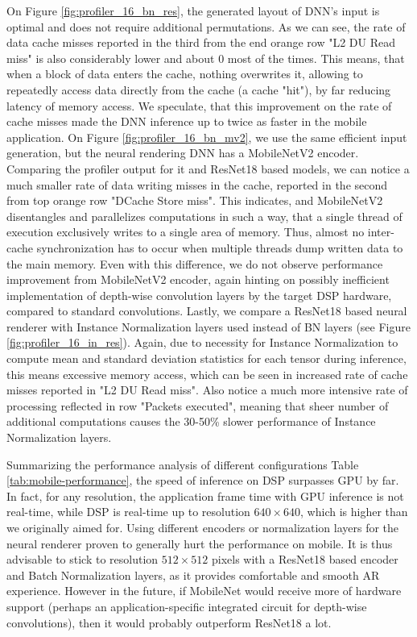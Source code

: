 On Figure \ref{fig:profiler_16_bn_res}, the generated layout of DNN's input is optimal and does not require additional permutations. As we can see, the rate of data cache misses reported in the third from the end orange row "L2 DU Read miss" is also considerably lower and about 0 most of the times. This means, that when a block of data enters the cache, nothing overwrites it, allowing to repeatedly access data directly from the cache (a cache "hit"), by far reducing latency of memory access. We speculate, that this improvement on the rate of cache misses made the DNN inference up to twice as faster in the mobile application. On Figure \ref{fig:profiler_16_bn_mv2}, we use the same efficient input generation, but the neural rendering DNN has a MobileNetV2 encoder. Comparing the profiler output for it and ResNet18 based models, we can notice a much smaller rate of data writing misses in the cache, reported in the second from top orange row "DCache Store miss". This indicates, and MobileNetV2 disentangles and parallelizes computations in such a way, that a single thread of execution exclusively writes to a single area of memory. Thus, almost no inter-cache synchronization has to occur when multiple threads dump written data to the main memory. Even with this difference, we do not observe performance improvement from MobileNetV2 encoder, again hinting on possibly inefficient implementation of depth-wise convolution layers by the target DSP hardware, compared to standard convolutions. Lastly, we compare a ResNet18 based neural renderer with Instance Normalization layers used instead of BN layers (see Figure \ref{fig:profiler_16_in_res}). Again, due to necessity for Instance Normalization to compute mean and standard deviation statistics for each tensor during inference, this means excessive memory access, which can be seen in increased rate of cache misses reported in "L2 DU Read miss". Also notice a much more intensive rate of processing reflected in row "Packets executed", meaning that sheer number of additional computations causes the 30-50\% slower performance of Instance Normalization layers.

Summarizing the performance analysis of different configurations Table \ref{tab:mobile-performance}, the speed of inference on DSP surpasses GPU by far. In fact, for any resolution, the application frame time with GPU inference is not real-time, while DSP is real-time up to resolution $640 \times 640$, which is higher than we originally aimed for. Using different encoders or normalization layers for the neural renderer proven to generally hurt the performance on mobile. It is thus advisable to stick to resolution $512 \times 512$ pixels with a ResNet18 based encoder and Batch Normalization layers, as it provides comfortable and smooth AR experience. However in the future, if MobileNet would receive more of hardware support (perhaps an application-specific integrated circuit for depth-wise convolutions), then it would probably outperform ResNet18 a lot.

